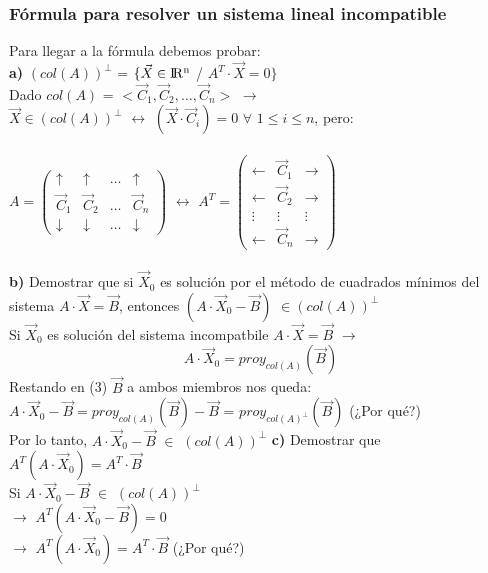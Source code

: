 \documentclass[11pt]{article}
\begin{document}
\subsubsection{Fórmula para resolver un sistema lineal incompatible}
Para llegar a la fórmula debemos probar:\\
\textbf{a)} $(col(A))^{\perp}$ = $\{\vec{X} \in \rm I\!R^n$ / $A^T\cdot\vec{X}=0\}$\\
Dado $col(A)$ = $<\vec{C}_1, \vec{C}_2, \ldots, \vec{C}_n>$ $\rightarrow$\\
$\vec{X} \in (col(A))^{\perp}$ $\leftrightarrow$ $(\vec{X}\cdot\vec{C}_i)=0$ $\forall$ $1 \leq i \leq n$, pero:\\\\
$A = \begin{pmatrix}
\uparrow & \uparrow & \ldots & \uparrow\\ 
\vec{C}_1 & \vec{C}_2 & \ldots & \vec{C}_n\\
\downarrow & \downarrow & \ldots & \downarrow 
\end{pmatrix}$
\indent $\leftrightarrow$ \indent
$A^T = \begin{pmatrix}
\leftarrow & \vec{C}_1 & \rightarrow\\ 
\leftarrow & \vec{C}_2 & \rightarrow\\
\vdots & \vdots & \vdots \\
\leftarrow & \vec{C}_n & \rightarrow 
\end{pmatrix}$\\\\
\textbf{b)} Demostrar que si $\vec{X}_0$ es solución por el
método de cuadrados mínimos del sistema $A\cdot\vec{X}=\vec{B}$, entonces $(A\cdot\vec{X}_0-\vec{B})$ $\in (col(A))^{\perp}$\\
Si $\vec{X}_0$ es solución del sistema incompatbile $A\cdot\vec{X}=\vec{B}$ $\rightarrow$\\
\begin{equation}
A\cdot\vec{X}_0=proy_{col(A)}(\vec{B})
\end{equation}
Restando en (3) $\vec{B}$ a ambos miembros nos queda:\\
$A\cdot\vec{X}_0 - \vec{B}=proy_{col(A)}(\vec{B}) - \vec{B}$ = $proy_{col(A)^{\perp}}(\vec{B})$ (¿Por qué?)\\
Por lo tanto, $A\cdot\vec{X}_0 - \vec{B}$ $\in$ $(col(A))^{\perp}$
\newpage
\noindent \textbf{c)} Demostrar que $A^T (A \cdot \vec{X}_0) = A^T \cdot \vec{B}$\\
Si $A \cdot \vec{X}_0 - \vec{B}$ $\in$ $(col(A))^{\perp}$\\
$\rightarrow$ $A^T (A\cdot\vec{X}_0 - \vec{B}) = 0$\\
$\rightarrow$ $A^T (A\cdot\vec{X}_0) = A^T \cdot \vec{B}$ (¿Por qué?)
\end{document}

